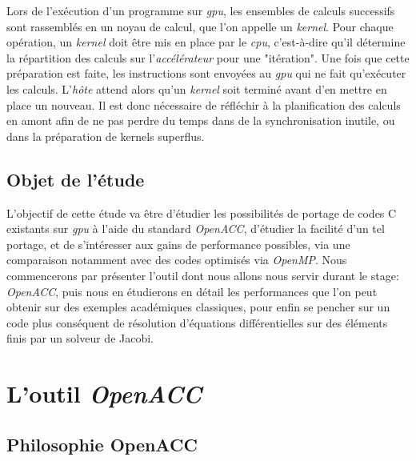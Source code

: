 \documentclass{article}
\begin{document}
Lors de l'exécution d'un programme sur \textit{\gls{gpu}}, les ensembles de calculs successifs sont rassemblés en un noyau de calcul, que l'on appelle un \textit{kernel}. Pour chaque opération, un \textit{kernel} doit être mis en place par le \textit{\gls{cpu}}, c'est-à-dire qu'il détermine la répartition des calculs sur l'\textit{accélérateur} pour une "itération". Une fois que cette préparation est faite, les instructions sont envoyées au \textit{\gls{gpu}} qui ne fait qu'exécuter les calculs. L'\textit{hôte} attend alors qu'un \textit{kernel} soit terminé avant d'en mettre en place un nouveau.
Il est donc nécessaire de réfléchir à la planification des calculs en amont afin de ne pas perdre du temps dans de la synchronisation inutile, ou dans la préparation de kernels superflus.


\subsection{Objet de l'étude}

L'objectif de cette étude va être d'étudier les possibilités de portage de codes C existants sur \textit{\gls{gpu}} à l'aide du standard \textit{OpenACC}, d'étudier la facilité d'un tel portage, et de s'intéresser aux gains de performance possibles, via une comparaison notamment avec des codes optimisés via \textit{OpenMP}.
Nous commencerons par présenter l'outil dont nous allons nous servir durant le stage: \textit{OpenACC}, puis nous en étudierons en détail les performances que l'on peut obtenir sur des exemples académiques classiques, pour enfin se pencher sur un code plus conséquent de résolution d'équations différentielles sur des éléments finis par un solveur de Jacobi.

\section{L'outil \textit{OpenACC}}

\subsection{Philosophie OpenACC}
\end{document}
